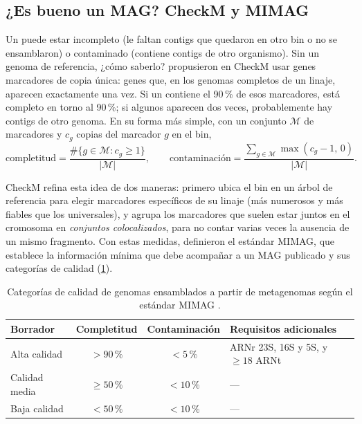\subsection{¿Es bueno un MAG? CheckM y MIMAG}

Un  puede estar incompleto (le faltan contigs que quedaron en otro bin o no se ensamblaron) o contaminado (contiene contigs de otro organismo). Sin un genoma de referencia, ¿cómo saberlo? \textcite{c14-parks2015} propusieron en CheckM usar genes marcadores de copia única: genes que, en los genomas completos de un linaje, aparecen exactamente una vez. Si un  contiene el 90\,\% de esos marcadores, está completo en torno al 90\,\%; si algunos aparecen dos veces, probablemente hay contigs de otro genoma. En su forma más simple, con un conjunto $\mathcal{M}$ de marcadores y $c_g$ copias del marcador $g$ en el bin,
\begin{equation}\label{eq:14-checkm}
\text{completitud} = \frac{\#\{g\in\mathcal{M}: c_g \ge 1\}}{|\mathcal{M}|}, \qquad
\text{contaminación} = \frac{\sum_{g\in\mathcal{M}} \max(c_g - 1,\, 0)}{|\mathcal{M}|}.
\end{equation}

\begin{simbolos}
\end{simbolos}

CheckM refina esta idea de dos maneras: primero ubica el bin en un árbol de referencia para elegir marcadores específicos de su linaje (más numerosos y más fiables que los universales), y agrupa los marcadores que suelen estar juntos en el cromosoma en \emph{conjuntos colocalizados}, para no contar varias veces la ausencia de un mismo fragmento. Con estas medidas, \textcite{c14-bowers2017} definieron el estándar MIMAG, que establece la información mínima que debe acompañar a un MAG publicado y sus categorías de calidad (\cref{tab:14-mimag}).

\begin{table}[t]
\centering
\small
\caption[Categorías de calidad MIMAG]{Categorías de calidad de genomas ensamblados a partir de metagenomas según el estándar MIMAG \parencite{c14-bowers2017}.}
\label{tab:14-mimag}
\begin{tabular}{@{}lccp{4.6cm}@{}}
\toprule
\textbf{Borrador} & \textbf{Completitud} & \textbf{Contaminación} & \textbf{Requisitos adicionales}\\
\midrule
Alta calidad & $>90\,\%$ & $<5\,\%$ & ARNr 23S, 16S y 5S, y $\ge 18$ ARNt\\
Calidad media & $\ge 50\,\%$ & $<10\,\%$ & ---\\
Baja calidad & $<50\,\%$ & $<10\,\%$ & ---\\
\bottomrule
\end{tabular}
\end{table}

